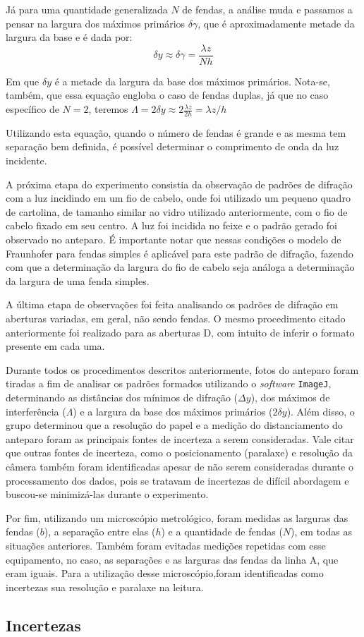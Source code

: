Já para uma quantidade generalizada $N$ de fendas, a análise muda e passamos a pensar na largura dos máximos primários $\delta\gamma$, que é aproximadamente metade da largura da base e é dada por:
\begin{equation}
    \delta y \approx \delta\gamma = \frac{\lambda z}{N h} \label{eq:mult}
\end{equation}

Em que $\delta y$ é a metade da largura da base dos máximos primários. Nota-se, também, que essa equação engloba o caso de fendas duplas, já que no caso específico de $N = 2$, teremos $\Lambda = 2 \delta y \approx 2 \frac{\lambda z}{2 h} = \lambda z / h$

Utilizando esta equação, quando o número de fendas é grande e as mesma tem separação bem definida, é possível determinar o comprimento de onda da luz incidente.

A próxima etapa do experimento consistia da observação de padrões de difração com a luz incidindo em um fio de cabelo, onde foi utilizado um pequeno quadro de cartolina, de tamanho similar ao vidro utilizado anteriormente, com o fio de cabelo fixado em seu centro. A luz foi incidida no feixe e o padrão gerado foi observado no anteparo. É importante notar que nessas condições o modelo de Fraunhofer para fendas simples é aplicável para este padrão de difração, fazendo com que a determinação da largura do fio de cabelo seja análoga a determinação da largura de uma fenda simples.

A última etapa de observações foi feita analisando os padrões de difração em aberturas variadas, em geral, não sendo fendas. O mesmo procedimento citado anteriormente foi realizado para as aberturas D, com intuito de inferir o formato presente em cada uma.

Durante todos os procedimentos descritos anteriormente, fotos do anteparo foram tiradas a fim de analisar os padrões formados utilizando o \textit{software} \texttt{ImageJ}\cite{ref:imagej}, determinando as distâncias dos mínimos de difração ($\Delta y$), dos máximos de interferência ($\Lambda$) e a largura da base dos máximos primários ($2 \delta y$). Além disso, o grupo determinou que a resolução do papel e a medição do distanciamento do anteparo foram as principais fontes de incerteza a serem consideradas. Vale citar que outras fontes de incerteza, como o posicionamento (paralaxe) e resolução da câmera também foram identificadas apesar de não serem consideradas durante o processamento dos dados, pois se tratavam de incertezas de difícil abordagem e buscou-se minimizá-las durante o experimento.

Por fim, utilizando um microscópio metrológico, foram medidas as larguras das fendas ($b$), a separação entre elas ($h$) e a quantidade de fendas ($N$), em todas as situações anteriores. Também foram evitadas medições repetidas com esse equipamento, no caso, as separações e as larguras das fendas da linha A, que eram iguais. Para a utilização desse microscópio,foram identificadas como incertezas sua resolução e paralaxe na leitura.

\subsection{Incertezas}
    
